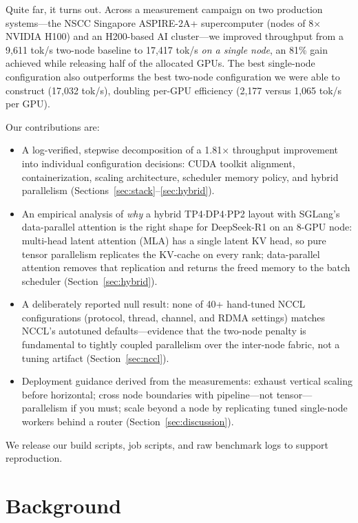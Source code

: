 \documentclass[sigconf]{acmart}
\begin{document}
Quite far, it turns out. Across a measurement campaign on two production systems---the NSCC Singapore ASPIRE-2A+ supercomputer (nodes of 8$\times$NVIDIA H100) and an H200-based AI cluster---we improved throughput from a 9{,}611 tok/s two-node baseline to 17{,}417 tok/s \emph{on a single node}, an 81\% gain achieved while releasing half of the allocated GPUs. The best single-node configuration also outperforms the best two-node configuration we were able to construct (17{,}032 tok/s), doubling per-GPU efficiency (2{,}177 versus 1{,}065 tok/s per GPU).

Our contributions are:
\begin{itemize}
\item A log-verified, stepwise decomposition of a 1.81$\times$ throughput improvement into individual configuration decisions: CUDA toolkit alignment, containerization, scaling architecture, scheduler memory policy, and hybrid parallelism (Sections~\ref{sec:stack}--\ref{sec:hybrid}).
\item An empirical analysis of \emph{why} a hybrid TP4$\cdot$DP4$\cdot$PP2 layout with SGLang's data-parallel attention is the right shape for DeepSeek-R1 on an 8-GPU node: multi-head latent attention (MLA) has a single latent KV head, so pure tensor parallelism replicates the KV-cache on every rank; data-parallel attention removes that replication and returns the freed memory to the batch scheduler (Section~\ref{sec:hybrid}).
\item A deliberately reported null result: none of 40+ hand-tuned NCCL configurations (protocol, thread, channel, and RDMA settings) matches NCCL's autotuned defaults---evidence that the two-node penalty is fundamental to tightly coupled parallelism over the inter-node fabric, not a tuning artifact (Section~\ref{sec:nccl}).
\item Deployment guidance derived from the measurements: exhaust vertical scaling before horizontal; cross node boundaries with pipeline---not tensor---parallelism if you must; scale beyond a node by replicating tuned single-node workers behind a router (Section~\ref{sec:discussion}).
\end{itemize}

We release our build scripts, job scripts, and raw benchmark logs to support reproduction.

\section{Background}
\end{document}
